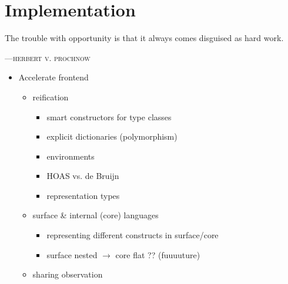 
\chapter{Implementation}
\epigraph{The trouble with opportunity is that it always comes disguised as hard work.}%
{\textsc{---herbert v. prochnow}}

\begin{itemize}
    \item Accelerate frontend
        \begin{itemize}
            \item reification
                \begin{itemize}
                    \item smart constructors for type classes
                    \item explicit dictionaries (polymorphism)
                    \item environments
                    \item HOAS vs. de Bruijn
                    \item representation types
                \end{itemize}
            \item surface \& internal (core) languages
                \begin{itemize}
                    \item representing different constructs in surface/core
                    \item surface nested $\rightarrow$ core flat ?? (fuuuuture)
                \end{itemize}
            \item sharing observation
        \end{itemize}


\end{itemize}
